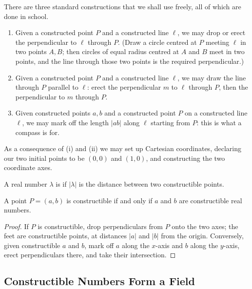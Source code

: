\documentclass[a4paper]{scrartcl}
\begin{document}
There are three standard constructions that we shall use freely, all of which are done in school.

\begin{enumerate}[label=(\roman*)]
	\item Given a constructed point $P$ and a constructed line $\ell$, we may drop or erect the perpendicular to $\ell$ through $P$. (Draw a circle centred at $P$ meeting $\ell$ in two points $A, B$; then circles of equal radius centred at $A$ and $B$ meet in two points, and the line through those two points is the required perpendicular.)
	\item Given a constructed point $P$ and a constructed line $\ell$, we may draw the line through $P$ parallel to $\ell$: erect the perpendicular $m$ to $\ell$ through $P$, then the perpendicular to $m$ through $P$.
	\item Given constructed points $a, b$ and a constructed point $P$ on a constructed line $\ell$, we may mark off the length $|ab|$ along $\ell$ starting from $P$: this is what a compass is for.
\end{enumerate}

As a consequence of (i) and (ii) we may set up Cartesian coordinates, declaring our two initial points to be $(0,0)$ and $(1,0)$, and constructing the two coordinate axes.

\begin{definition}
	A real number $\lambda$ is  if $|\lambda|$ is the distance between two constructible points.
\end{definition}

\begin{lemma}
	A point $P = (a,b)$ is constructible if and only if $a$ and $b$ are constructible real numbers.
\end{lemma}

\begin{proof}
	If $P$ is constructible, drop perpendiculars from $P$ onto the two axes; the feet are constructible points, at distances $|a|$ and $|b|$ from the origin. Conversely, given constructible $a$ and $b$, mark off $a$ along the $x$-axis and $b$ along the $y$-axis, erect perpendiculars there, and take their intersection.
\end{proof}

\subsection{Constructible Numbers Form a Field}
\end{document}
